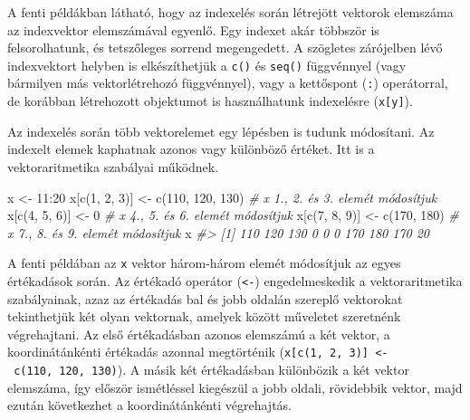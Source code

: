 \documentclass[
]{book}
\newenvironment{Shaded}{\begin{snugshade}}{\end{snugshade}}
\newcommand{\CommentTok}[1]{\textcolor[rgb]{0.56,0.35,0.01}{\textit{#1}}}
\newcommand{\DecValTok}[1]{\textcolor[rgb]{0.00,0.00,0.81}{#1}}
\newcommand{\FunctionTok}[1]{\textcolor[rgb]{0.00,0.00,0.00}{#1}}
\newcommand{\NormalTok}[1]{#1}
\newcommand{\OtherTok}[1]{\textcolor[rgb]{0.56,0.35,0.01}{#1}}
\newcommand{\SpecialCharTok}[1]{\textcolor[rgb]{0.00,0.00,0.00}{#1}}
\begin{document}
A fenti példákban látható, hogy az indexelés során létrejött vektorok elemszáma az indexvektor elemszámával egyenlő. Egy indexet akár többször is felsorolhatunk, és tetszőleges sorrend megengedett. A szögletes zárójelben lévő indexvektort helyben is elkészíthetjük a \texttt{c()} és \texttt{seq()} függvénnyel (vagy bármilyen más vektorlétrehozó függvénnyel), vagy a kettőspont (\texttt{:}) operátorral, de korábban létrehozott objektumot is használhatunk indexelésre (\texttt{x{[}y{]}}).

Az indexelés során több vektorelemet egy lépésben is tudunk módosítani. Az indexelt elemek kaphatnak azonos vagy különböző értéket. Itt is a vektoraritmetika szabályai működnek.

\begin{Shaded}
\begin{Highlighting}[]
\NormalTok{x }\OtherTok{\textless{}{-}} \DecValTok{11}\SpecialCharTok{:}\DecValTok{20}           
\NormalTok{x[}\FunctionTok{c}\NormalTok{(}\DecValTok{1}\NormalTok{, }\DecValTok{2}\NormalTok{, }\DecValTok{3}\NormalTok{)] }\OtherTok{\textless{}{-}} \FunctionTok{c}\NormalTok{(}\DecValTok{110}\NormalTok{, }\DecValTok{120}\NormalTok{, }\DecValTok{130}\NormalTok{) }\CommentTok{\# x 1., 2. és 3. elemét módosítjuk}
\NormalTok{x[}\FunctionTok{c}\NormalTok{(}\DecValTok{4}\NormalTok{, }\DecValTok{5}\NormalTok{, }\DecValTok{6}\NormalTok{)] }\OtherTok{\textless{}{-}} \DecValTok{0}                \CommentTok{\# x 4., 5. és 6. elemét módosítjuk}
\NormalTok{x[}\FunctionTok{c}\NormalTok{(}\DecValTok{7}\NormalTok{, }\DecValTok{8}\NormalTok{, }\DecValTok{9}\NormalTok{)] }\OtherTok{\textless{}{-}} \FunctionTok{c}\NormalTok{(}\DecValTok{170}\NormalTok{, }\DecValTok{180}\NormalTok{)      }\CommentTok{\# x 7., 8. és 9. elemét módosítjuk}
\NormalTok{x}
\CommentTok{\#\textgreater{}  [1] 110 120 130   0   0   0 170 180 170  20}
\end{Highlighting}
\end{Shaded}

A fenti példában az \texttt{x} vektor három-három elemét módosítjuk az egyes értékadások során. Az értékadó operátor (\texttt{\textless{}-}) engedelmeskedik a vektoraritmetika szabályainak, azaz az értékadás bal és jobb oldalán szereplő vektorokat tekinthetjük két olyan vektornak, amelyek között műveletet szeretnénk végrehajtani. Az első értékadásban azonos elemszámú a két vektor, a koordinátánkénti értékadás azonnal megtörténik (\texttt{x{[}c(1,\ 2,\ 3){]}\ \textless{}-\ c(110,\ 120,\ 130)}). A másik két értékadásban különbözik a két vektor elemszáma, így először ismétléssel kiegészül a jobb oldali, rövidebbik vektor, majd ezután következhet a koordinátánkénti végrehajtás.
\end{document}
